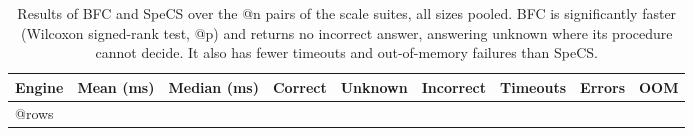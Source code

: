 \begin{table}[t]
  \centering
  \small
  \caption{Results of \acs{BFC} and SpeCS over the @n pairs of the scale suites, all sizes pooled.
\acs{BFC} is significantly faster (Wilcoxon signed-rank test, @p) and returns no incorrect answer, answering unknown where its procedure cannot decide.
It also has fewer timeouts and out-of-memory failures than SpeCS.}
  \label{fig:scale_bfc_specs}
  \begin{tabular}{lrrrrrrrr}
    \toprule
    Engine & Mean (ms) & Median (ms) & Correct & Unknown & Incorrect & Timeouts & Errors & OOM \\
    \midrule
@rows
    \bottomrule
  \end{tabular}
\end{table}
